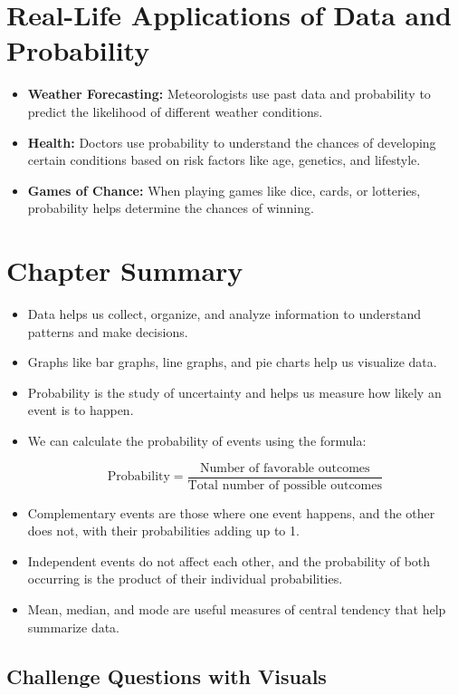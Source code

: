 \section{Real-Life Applications of Data and Probability}
\begin{itemize}
    \item \textbf{Weather Forecasting:} Meteorologists use past data and probability to predict the likelihood of different weather conditions.
    \item \textbf{Health:} Doctors use probability to understand the chances of developing certain conditions based on risk factors like age, genetics, and lifestyle.
    \item \textbf{Games of Chance:} When playing games like dice, cards, or lotteries, probability helps determine the chances of winning.
\end{itemize}

\section{Chapter Summary}
\begin{itemize}
    \item Data helps us collect, organize, and analyze information to understand patterns and make decisions.
    \item Graphs like bar graphs, line graphs, and pie charts help us visualize data.
    \item Probability is the study of uncertainty and helps us measure how likely an event is to happen.
    \item We can calculate the probability of events using the formula: 
    
    \[
    \text{Probability} = \frac{\text{Number of favorable outcomes}}{\text{Total number of possible outcomes}}
    \]
    
    \item Complementary events are those where one event happens, and the other does not, with their probabilities adding up to 1.
    \item Independent events do not affect each other, and the probability of both occurring is the product of their individual probabilities.
    \item Mean, median, and mode are useful measures of central tendency that help summarize data.
\end{itemize}

\subsection{Challenge Questions with Visuals}

